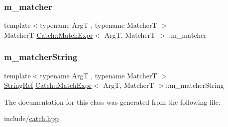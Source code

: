\subsubsection{\texorpdfstring{m\_matcher}{m\_matcher}}
{\footnotesize\ttfamily template$<$typename ArgT , typename MatcherT $>$ \\
MatcherT \mbox{\hyperlink{class_catch_1_1_match_expr}{Catch\+::\+Match\+Expr}}$<$ ArgT, MatcherT $>$\+::m\+\_\+matcher\hspace{0.3cm}{\ttfamily [private]}}

\mbox{\label{class_catch_1_1_match_expr_a33ec706994f744ff1f4a549177ec08f9}} 
\subsubsection{\texorpdfstring{m\_matcherString}{m\_matcherString}}
{\footnotesize\ttfamily template$<$typename ArgT , typename MatcherT $>$ \\
\mbox{\hyperlink{class_catch_1_1_string_ref}{String\+Ref}} \mbox{\hyperlink{class_catch_1_1_match_expr}{Catch\+::\+Match\+Expr}}$<$ ArgT, MatcherT $>$\+::m\+\_\+matcher\+String\hspace{0.3cm}{\ttfamily [private]}}



The documentation for this class was generated from the following file\+:\begin{DoxyCompactItemize}
\item 
include/\mbox{\hyperlink{catch_8hpp}{catch.\+hpp}}\end{DoxyCompactItemize}
